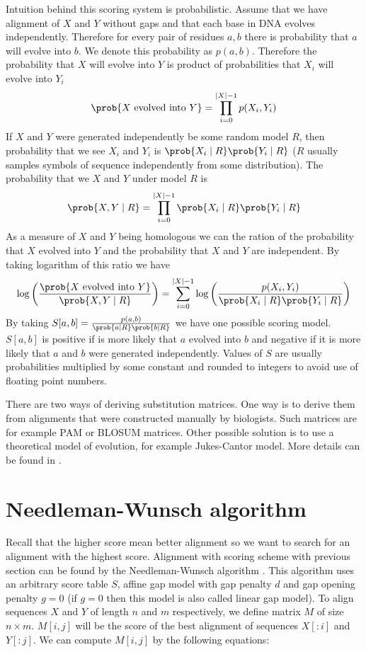 Intuition behind this scoring system is probabilistic. Assume that we have
alignment of $X$ and $Y$ without gaps and that each base in DNA evolves
independently. Therefore for every pair of residues $a,b$ there is probability
that $a$ will evolve into $b$. We denote this probability as $p(a,b)$. Therefore the probability that $X$ will evolve
into $Y$ is product of probabilities that $X_i$ will evolve into $Y_i$
\[
\prob{X\text{ evolved into }Y} = \prod_{i=0}^{|X|-1}p(X_i,Y_i)
\]
If $X$ and $Y$ were generated independently be some random model $R$, then probability that we see $X_i$
and $Y_i$ is $\prob{X_i\mid R}\prob{Y_i\mid R}$ ($R$ usually samples symbols
of sequence independently from some distribution). The probability that we $X$
and $Y$ under model $R$ is
\[
\prob{X,Y\mid R} = \prod_{i=0}^{|X|-1}\prob{X_i\mid R}\prob{Y_i\mid R}
\]
As a measure of  $X$ and $Y$ being homologous we can the ration of the
probability that $X$ evolved into $Y$ and the probability that $X$ and $Y$ are
independent.
By taking logarithm of this ratio we have
\[
\log\left(
\frac{\prob{X\text{ evolved into }Y}}{\prob{X,Y\mid R} }\right)
= \sum_{i=0}^{|X|-1}\log\left(\frac{p(X_i,Y_i)}{\prob{X_i\mid R}\prob{Y_i\mid
R}}
\right)
\]
By taking $S[a,b]=\frac{p(a,b)}{\prob{a\mid R}\prob{b\mid R}}$ we have one
possible scoring model. $S[a,b]$ is positive if is more likely that $a$ evolved
into $b$ and negative if it is more likely that $a$ and $b$ were generated
independently.  Values of $S$ are usually probabilities multiplied by some
constant and rounded to integers to avoid use of floating point numbers. 

There are two ways of deriving substitution matrices. One way is to derive them
from alignments that were constructed manually by biologists. Such matrices are
for example PAM or BLOSUM matrices. Other possible solution is to use a
theoretical model of evolution, for example Jukes-Cantor model. More details can
be found in \cite{Durbin1998}.



\section{Needleman-Wunsch algorithm}
\label{SECTION:NEEDLE}

Recall that the higher score mean better alignment so we want to search for an
alignment with the highest score.  Alignment with scoring scheme with previous
section can be found by the Needleman-Wunsch algorithm \cite{Durbin1998}.
This algorithm uses an arbitrary score table $S$, affine gap model with gap penalty
$d$ and gap opening penalty $g=0$ (if $g=0$ then this model is also called
linear gap model). To align sequences $X$ and $Y$ of length $n$ and $m$
respectively, we define matrix $M$ of size $n\times m$. $M[i,j]$ will be the
score of the best alignment of sequences $X[:i]$ and $Y[:j]$. We can compute
$M[i,j]$ by the following equations:

